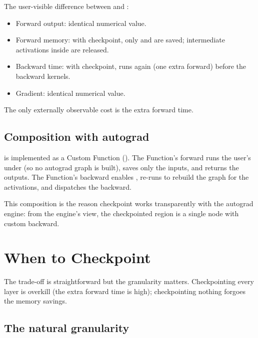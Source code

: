The user-visible difference between  and
:

\begin{itemize}
  \item Forward output: identical numerical value.
  \item Forward memory: with checkpoint, only  and
     are saved; intermediate activations inside
     are released.
  \item Backward time: with checkpoint,  runs again
    (one extra forward) before the backward kernels.
  \item Gradient: identical numerical value.
\end{itemize}

The only externally observable cost is the extra forward time.

\subsection{Composition with autograd}
\label{ssec:gradient_checkpointing:autograd_compose}

 is implemented as a Custom Function
(). The Function's forward runs the
user's  under  (so no autograd graph is
built), saves only the inputs, and returns the outputs. The
Function's backward enables , re-runs 
to rebuild the graph for the activations, and dispatches the
backward.

This composition is the reason checkpoint works transparently
with the autograd engine: from the engine's view, the checkpointed
region is a single node with custom backward.

\section{When to Checkpoint}
\label{sec:gradient_checkpointing:when}

The trade-off is straightforward but the granularity matters.
Checkpointing every layer is overkill (the extra forward time is
high); checkpointing nothing forgoes the memory savings.

\subsection{The natural granularity}
\label{ssec:gradient_checkpointing:granularity}

